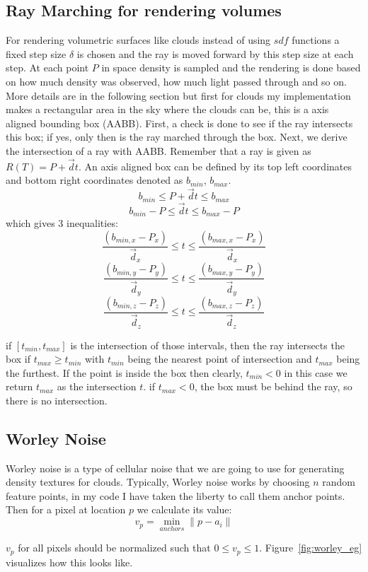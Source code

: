 \subsection{Ray Marching for rendering volumes}
For rendering volumetric surfaces like clouds instead of using $sdf$ functions a fixed step size $\delta$ is chosen and the ray is moved forward by this step size at each step. At each point $P$ in space density is sampled and the rendering is done based on how much density was observed, how much light passed through and so on. More details are in the following section but first for clouds my implementation makes a rectangular area in the sky where the clouds can be, this is a axis aligned bounding box (AABB). First, a check is done to see if the ray intersects this box; if yes, only then is the ray marched through the box.
Next, we derive the intersection of a ray with AABB. Remember that a ray is given as $R(T) = P + \vec{d}t$. An axis aligned box can be defined by its top left coordinates and bottom right coordinates denoted as $b_{min}$, $b_{max}$.
\[
b_{min} \le P + \vec{d}t \le b_{max}
\]
\[
b_{min} - P \le \vec{d}t \le b_{max} - P
\]
which gives 3 inequalities:
\[
\frac{(b_{min, x} - P_x)}{\vec{d}_x} \le t \le \frac{(b_{max, x} - P_x)}{\vec{d}_x}
\]
\[
\frac{(b_{min, y} - P_y)}{\vec{d}_y} \le t \le \frac{(b_{max, y} - P_y)}{\vec{d}_y}
\]
\[
\frac{(b_{min, z} - P_z)}{\vec{d}_z} \le t \le \frac{(b_{max, z} - P_z)}{\vec{d}_z}
\]

if $[t_{min}, t_{max}]$ is the intersection of those intervals, then the ray intersects the box if $t_{max} \ge t_{min}$ with $t_{min}$ being the nearest point of intersection and $t_{max}$ being the furthest. If the point is inside the box then clearly, $t_{min} < 0$ in this case we return $t_{max}$ as the intersection $t$. if $t_{max} < 0$, the box must be behind the ray, so there is no intersection.

\subsection{Worley Noise}
Worley noise is a type of cellular noise that we are going to use for generating density textures for clouds. Typically, Worley noise works by choosing $n$ random feature points, in my code I have taken the liberty to call them anchor points. Then for a pixel at location $p$ we calculate its value:
\[
v_p = \min_{anchors} \|p - a_i\| 
\]

$v_p$ for all pixels should be normalized such that $0 \le v_p \le 1$. Figure~\ref{fig:worley_eg} visualizes how this looks like.

